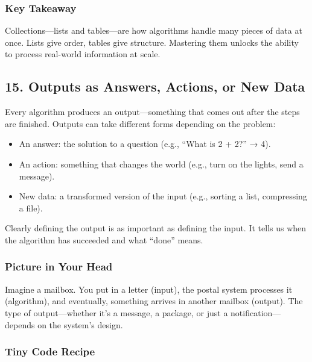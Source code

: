 \documentclass[
  letterpaper,
  DIV=11,
  numbers=noendperiod]{scrreprt}
\providecommand{\tightlist}{%
  \setlength{\itemsep}{0pt}\setlength{\parskip}{0pt}}
\begin{document}
\subsubsection{Key Takeaway}\label{key-takeaway-12}

Collections---lists and tables---are how algorithms handle many pieces
of data at once. Lists give order, tables give structure. Mastering them
unlocks the ability to process real-world information at scale.

\subsection{15. Outputs as Answers, Actions, or New
Data}\label{outputs-as-answers-actions-or-new-data}

Every algorithm produces an output---something that comes out after the
steps are finished. Outputs can take different forms depending on the
problem:

\begin{itemize}
\tightlist
\item
  An answer: the solution to a question (e.g., ``What is 2 + 2?'' → 4).
\item
  An action: something that changes the world (e.g., turn on the lights,
  send a message).
\item
  New data: a transformed version of the input (e.g., sorting a list,
  compressing a file).
\end{itemize}

Clearly defining the output is as important as defining the input. It
tells us when the algorithm has succeeded and what ``done'' means.

\subsubsection{Picture in Your Head}\label{picture-in-your-head-14}

Imagine a mailbox. You put in a letter (input), the postal system
processes it (algorithm), and eventually, something arrives in another
mailbox (output). The type of output---whether it's a message, a
package, or just a notification---depends on the system's design.

\subsubsection{Tiny Code Recipe}\label{tiny-code-recipe-13}
\end{document}
